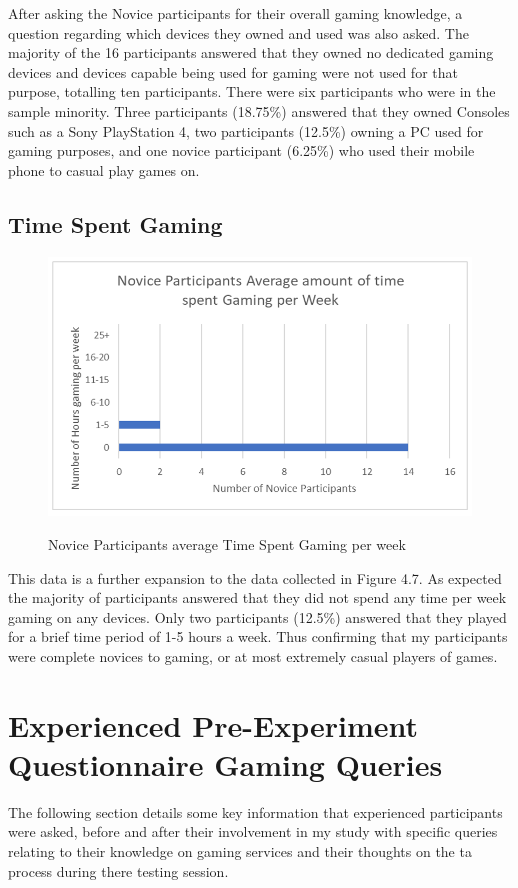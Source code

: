 After asking the Novice participants for their overall gaming knowledge, a question regarding which devices they owned and used was also asked. The majority of the 16 participants answered that they owned no dedicated gaming devices and devices capable being used for gaming were not used for that purpose, totalling ten participants. There were six participants who were in the sample minority. Three participants (18.75\%) answered that they owned Consoles such as a Sony PlayStation 4, two participants (12.5\%) owning a PC used for gaming purposes, and one novice participant (6.25\%) who used their mobile phone to casual play games on. 

\subsection{Time Spent Gaming}
\begin{figure}[H]
\includegraphics[width=\linewidth]{Screenshots/DemographicsQuestionaires/noviceQuestionaireData/noviceTimeSpentGaming.png}
\label{NoviceTimeGaming}
\caption{Novice Participants average Time Spent Gaming per week}
\end{figure}

This data is a further expansion to the data collected in Figure 4.7. As expected the majority of participants answered that they did not spend any time per week gaming on any devices. Only two participants (12.5\%) answered that they played for a brief time period of 1-5 hours a week. Thus confirming that my participants were complete novices to gaming, or at most extremely casual players of games. 

\section{Experienced Pre-Experiment Questionnaire Gaming Queries}
The following section details some key information that experienced participants were asked, before and after their involvement in my study with specific queries relating to their knowledge on gaming services and their thoughts on the \gls{ta} process during there testing session.

